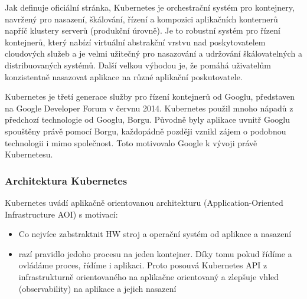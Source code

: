 \documentclass[thesis=M,czech]{FITthesis}[2019/12/23]
\theoremstyle{plain}
\theoremstyle{definition}
\begin{document}
Jak definuje oficiální stránka, Kubernetes je orchestrační systém pro kontejnery, navržený pro nasazení, škálování, řízení a kompozici aplikačních konternerů napříč klustery serverů (produkční úrovně). Je to robustní systém pro řízení  kontejnerů, který nabízí virtuální abstrakční vrstvu nad poskytovatelem cloudových služeb a je velmi užitečný pro nasazování a udržování škálovatelných a distribuovaných systémů. Další velkou výhodou je, že pomáhá uživatelům konzistentně nasazovat aplikace na různé aplikační poskutovatele.

Kubernetes je třetí generace služby pro řízení kontejnerů od Googlu, představen na Google Developer Forum v červnu 2014. Kubernetes použil mnoho nápadů z předchozí technologie od Googlu, Borgu. Původně byly aplikace uvnitř Googlu spouštěny právě pomocí Borgu, každopádně později vznikl zájem o podobnou technologii i mimo společnost. Toto motivovalo Google k vývoji právě Kubernetesu.  

\subsubsection{Architektura Kubernetes}




Kubernetes uvádí aplikačně orientovanou architekturu (Application-Oriented Infrastructure AOI)\cite{as-k8s-san-kho-lin}
s motivací:


\begin{itemize}  
\item  Co nejvíce zabstraktnit HW stroj a operační systém od aplikace a nasazení 
\item  razí pravidlo jedoho procesu na jeden kontejner. Díky tomu pokud řídíme a ovládáme proces, řídíme i aplikaci. Proto posouvá Kubernetes API z infrastrukturně orientovaného na aplikačne orientovaný a zlepšuje vhled (observability) na aplikace a jejich nasazení


\end{itemize}
\end{document}
